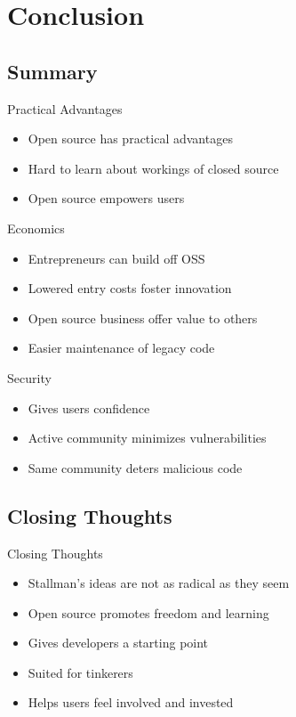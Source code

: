 \section{Conclusion}\frame{\sectionpage}

\subsection{Summary}
\begin{frame}{Practical Advantages}
  \begin{itemize}
    \item Open source has practical advantages
    \item Hard to learn about workings of closed source
    \item Open source empowers users
  \end{itemize}
\end{frame}

\begin{frame}{Economics}
  \begin{itemize}
    \item Entrepreneurs can build off OSS
    \item Lowered entry costs foster innovation
    \item Open source business offer value to others
    \item Easier maintenance of legacy code
  \end{itemize}
\end{frame}


\begin{frame}{Security}
  \begin{itemize}
    \item Gives users confidence
    \item Active community minimizes vulnerabilities
    \item Same community deters malicious code
  \end{itemize}
\end{frame}

\subsection{Closing Thoughts}
\begin{frame}{Closing Thoughts}
  \begin{itemize}
    \item Stallman's ideas are not as radical as they seem
    \item Open source promotes freedom and learning
    \item Gives developers a starting point
    \item Suited for tinkerers
    \item Helps users feel involved and invested
  \end{itemize}
\end{frame}
